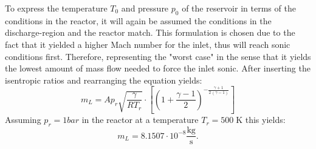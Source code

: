 	To express the temperature $T_0$ and pressure $p_0$ of the reservoir in terms of the conditions in the reactor, it will again be assumed the conditions in the discharge-region and the reactor match.
	This formulation is chosen due to the fact that it yielded a higher Mach number for the inlet, thus will reach sonic conditions first.
	Therefore, representing the "worst case" in the sense that it yields the lowest amount of mass flow needed to force the inlet sonic.
	After inserting the isentropic ratios and rearranging the equation yields:
	\begin{equation}
		m_L =
		A p_r\sqrt{\frac{\gamma}{R T_r}}\cdot
		\left[
			\left(
				1 + \frac{\gamma - 1}{2}
			\right)
				^{-\frac{\gamma + 1}{2\,(\gamma - 1)}}
		\right]
	\end{equation}
	Assuming $p_r = 1 bar$ in the reactor at a temperature $T_r = 500\;\text{K}$ this yields:
	$$
		m_L = 8.1507\cdot 10^{-8}\frac{\text{kg}}{\text{s}}.
	$$	
